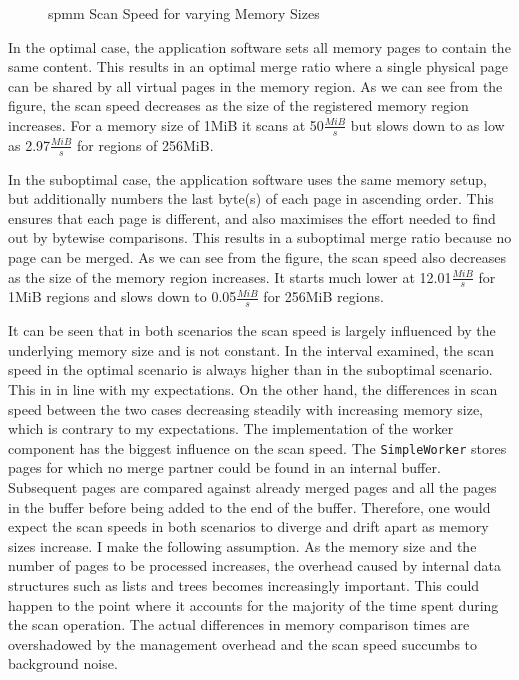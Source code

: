 \begin{figure}
  \centering
  
  \caption{\acs{spmm} Scan Speed for varying Memory Sizes}
  \label{fig:scan-speed}
\end{figure}

In the optimal case, the application software sets all memory pages to contain the same content.
This results in an optimal merge ratio where a single physical page can be shared by all virtual pages in the memory region.
As we can see from the figure, the scan speed decreases as the size of the registered memory region increases.
For a memory size of 1MiB it scans at 50$\frac{MiB}{s}$ but slows down to as low as 2.97$\frac{MiB}{s}$ for regions of 256MiB.

In the suboptimal case, the application software uses the same memory setup, but additionally numbers the last byte(s) of each page in ascending order.
This ensures that each page is different, and also maximises the effort needed to find out by bytewise comparisons.
This results in a suboptimal merge ratio because no page can be merged.
As we can see from the figure, the scan speed also decreases as the size of the memory region increases.
It starts much lower at 12.01$\frac{MiB}{s}$ for 1MiB regions and slows down to 0.05$\frac{MiB}{s}$ for 256MiB regions.

It can be seen that in both scenarios the scan speed is largely influenced by the underlying memory size and is not constant.
In the interval examined, the scan speed in the optimal scenario is always higher than in the suboptimal scenario.
This in in line with my expectations.
On the other hand, the differences in scan speed between the two cases decreasing steadily with increasing memory size, which is contrary to my expectations.
The implementation of the worker component has the biggest influence on the scan speed.
The \texttt{Simple\-Worker} stores pages for which no merge partner could be found in an internal buffer.
Subsequent pages are compared against already merged pages and all the pages in the buffer before being added to the end of the buffer.
Therefore, one would expect the scan speeds in both scenarios to diverge and drift apart as memory sizes increase.
I make the following assumption.
As the memory size and the number of pages to be processed increases, the overhead caused by internal data structures such as lists and trees becomes increasingly important.
This could happen to the point where it accounts for the majority of the time spent during the scan operation.
The actual differences in memory comparison times are overshadowed by the management overhead and the scan speed succumbs to background noise.


